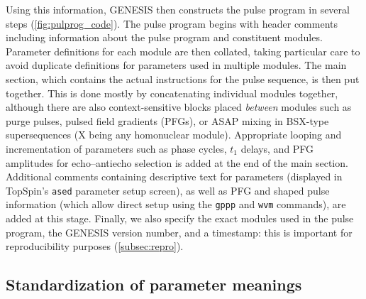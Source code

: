 \documentclass[a4paper,11pt]{article}
\begin{document}
\begin{refsection}
Using this information, GENESIS then constructs the pulse program in several steps (\cref{fig:pulprog_code}).
The pulse program begins with header comments including information about the pulse program and constituent modules.
Parameter definitions for each module are then collated, taking particular care to avoid duplicate definitions for parameters used in multiple modules.
The main section, which contains the actual instructions for the pulse sequence, is then put together.
This is done mostly by concatenating individual modules together, although there are also context-sensitive blocks placed \textit{between} modules such as purge pulses, pulsed field gradients (PFGs), or ASAP mixing\autocite{Claridge2019MRC} in BSX-type supersequences (X being any homonuclear module).
Appropriate looping and incrementation of parameters such as phase cycles, \(t_1\) delays, and PFG amplitudes for echo--antiecho selection is added at the end of the main section.
Additional comments containing descriptive text for parameters (displayed in TopSpin's \texttt{ased} parameter setup screen), as well as PFG and shaped pulse information (which allow direct setup using the \texttt{gppp} and \texttt{wvm} commands), are added at this stage.
Finally, we also specify the exact modules used in the pulse program, the GENESIS version number, and a timestamp: this is important for reproducibility purposes (\cref{subsec:repro}).


\subsection{Standardization of parameter meanings}


\end{refsection}
\end{document}
